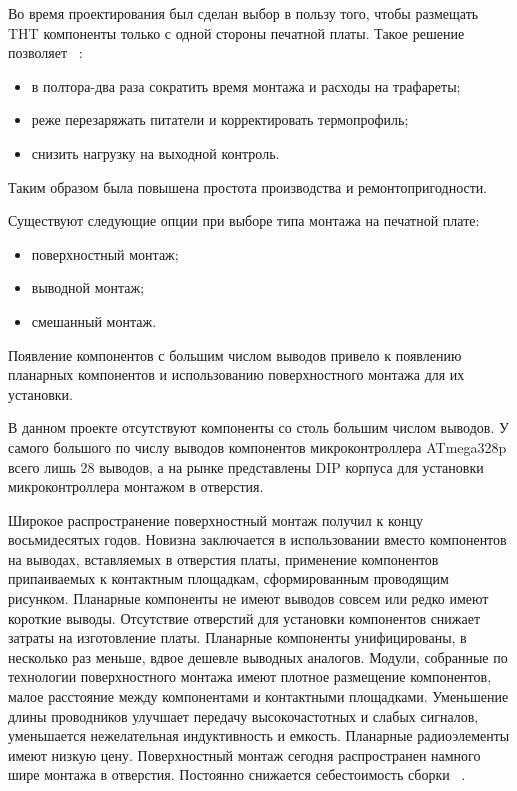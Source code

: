 
Во время проектирования был сделан выбор в пользу того, чтобы размещать
THT компоненты только с одной стороны печатной платы.
Такое решение позволяет ~\cite{yadro-habr-764056}:
\begin{itemize}
\item в полтора-два раза сократить время монтажа и расходы на трафареты;
\item реже перезаряжать питатели и корректировать термопрофиль;  
\item снизить нагрузку на выходной контроль.
\end{itemize}

Таким образом была повышена простота производства и ремонтопригодности.

Существуют следующие опции при выборе типа монтажа на печатной плате:
\begin{itemize}
\item поверхностный монтаж;
\item выводной монтаж;
\item смешанный монтаж.
\end{itemize}

Появление компонентов с большим числом выводов привело к появлению
планарных компонентов и использованию поверхностного монтажа для их
установки.

В данном проекте отсутствуют компоненты со столь большим числом
выводов. У самого большого по числу выводов компонентов
микроконтроллера ATmega328p всего лишь 28 выводов, а на рынке
представлены DIP корпуса для установки микроконтроллера
монтажом в отверстия.

Широкое распространение поверхностный монтаж получил к концу
восьмидесятых годов. Новизна заключается в использовании вместо
компонентов на выводах, вставляемых в отверстия платы, применение
компонентов припаиваемых к контактным площадкам, сформированным
проводящим рисунком. Планарные компоненты не имеют выводов совсем или
редко имеют короткие выводы. Отсутствие отверстий для установки
компонентов снижает затраты на изготовление платы. Планарные
компоненты унифицированы, в несколько раз меньше, вдвое дешевле
выводных аналогов. Модули, собранные по технологии поверхностного
монтажа имеют плотное размещение компонентов, малое расстояние между
компонентами и контактными площадками. Уменьшение длины проводников
улучшает передачу высокочастотных и слабых сигналов, уменьшается
нежелательная индуктивность и емкость. Планарные радиоэлементы имеют
низкую цену. Поверхностный монтаж сегодня распространен намного шире
монтажа в отверстия. Постоянно снижается себестоимость сборки
~\cite{платы.рф-монтаж}.

